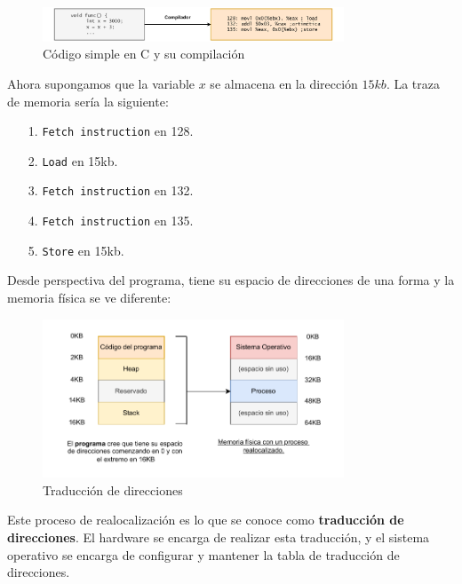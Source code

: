 \documentclass{article}
\begin{document}
\begin{figure}[h]
    \centering
    \includegraphics[width=0.8\textwidth]{src/gcc.pdf}
    \caption{Código simple en C y su compilación}
\end{figure}
Ahora supongamos que la variable $x$ se almacena en la dirección $15kb$. La traza de memoria sería la siguiente:
\begin{itemize}
    \item[1.] \texttt{Fetch instruction} en 128.
    \item[2.] \texttt{Load} en 15kb.
    \item[3.] \texttt{Fetch instruction} en 132.
    \item[4.] \texttt{Fetch instruction} en 135.
    \item[5.] \texttt{Store} en 15kb.
\end{itemize}

Desde perspectiva del programa, tiene su espacio de direcciones de una forma y la memoria física se ve diferente:

\begin{figure}[h]
    \centering
    \includegraphics[width=0.8\textwidth]{src/realocatedp.pdf}
    \caption{Traducción de direcciones}
\end{figure}

Este proceso de realocalización es lo que se conoce como \textbf{traducción de direcciones}. El hardware se encarga de realizar esta traducción, y el sistema operativo se encarga de configurar y mantener la tabla de traducción de direcciones.
\end{document}
